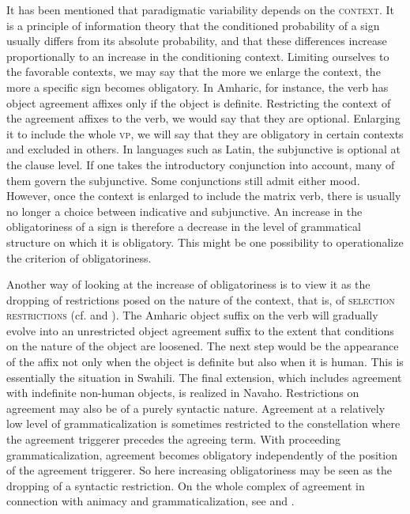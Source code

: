It has been mentioned that paradigmatic variability depends on the \textsc{context}. It is a principle of information theory that the conditioned probability of a sign usually differs from its absolute probability, and that these differences increase proportionally to an increase in the conditioning context. Limiting ourselves to the favorable contexts, we may say that the more we enlarge the context, the more a specific sign becomes obligatory. In Amharic, for instance, the verb has object agreement affixes only if the object is definite. Restricting the context of the agreement affixes to the verb, we would say that they are optional. Enlarging it to include the whole \textsc{vp}, we will say that they are obligatory in certain contexts and excluded in others. In languages such as Latin, the subjunctive is optional at the clause level. If one takes the introductory conjunction into account, many of them govern the subjunctive. Some conjunctions still admit either mood. However, once the context is enlarged to include the matrix verb, there is usually no longer a choice between indicative and subjunctive. An increase in the obligatoriness of a sign is therefore a decrease in the level of grammatical structure on which it is obligatory. This might be one possibility to operationalize the criterion of obligatoriness.

Another way of looking at the increase of obligatoriness is to view it as the dropping of restrictions posed on the nature of the context, that is, of \textsc{selection restrictions} (cf. \citealt[56]{Vincent1980a} and \citealt[99f]{Serzisko1981}). The Amharic object suffix on the verb will gradually evolve into an unrestricted object agreement suffix to the extent that conditions on the nature of the object are loosened. The next step would be the appearance of the affix not only when the object is definite but also when it is human. This is essentially the situation in Swahili. The final extension, which includes agreement with indefinite non-human objects, is realized in Navaho. Restrictions on agreement may also be of a purely syntactic nature. Agreement at a relatively low level of grammaticalization is sometimes restricted to the constellation where the agreement triggerer precedes the agreeing term. With proceeding grammaticalization, agreement becomes obligatory independently of the position of the agreement triggerer. So here increasing obligatoriness may be seen as the dropping of a syntactic restriction. On the whole complex of agreement in connection with animacy and grammaticalization, see \citealt[184f]{Comrie1981b} and \citealt[§~6.2]{Lehmann1982b}.

